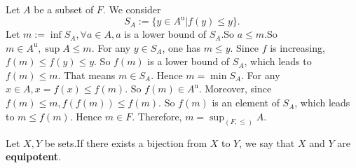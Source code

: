 \documentclass{book}
\numberwithin{equation}{section}
\begin{document}
\begin{proofenv}
    Let $A$ be a subset of $F$. We consider 
    $$S_A:=\{y\in A^\mathrm{u}|f(y)\le y\}.$$
    Let $m:=\inf S_A, \forall a\in A, a$ is a lower bound of $S_A$.So $a\le m$.So $m\in A^\mathrm{u}, \sup A\le m$. For any $y\in S_A$, one has $m\le y$. Since $f$ is increasing,  $f(m)\le f(y)\le y$. So $f(m)$ is a lower bound of $S_A$,  which leads to $f(m)\le m$. That means $m\in S_A$. Hence $m=\min S_A$. For any $x\in A, x=f(x)\le f(m)$. So $f(m)\in A^\mathrm{u}$. Moreover,  since $f(m)\le m , f(f(m))\le f(m)$. So $f(m)$ is an element of $S_A$,  which leads to $m\le f(m)$. Hence $m\in F$. Therefore,  $m=\sup_{(F, \le)}A$.
\end{proofenv}
\begin{definitionenv}
    Let $X, Y$ be sets.If there exists a bijection from $X$ to $Y$,  we say that $X$ and $Y$ are \textbf{equipotent}.
\end{definitionenv}
\end{document}
